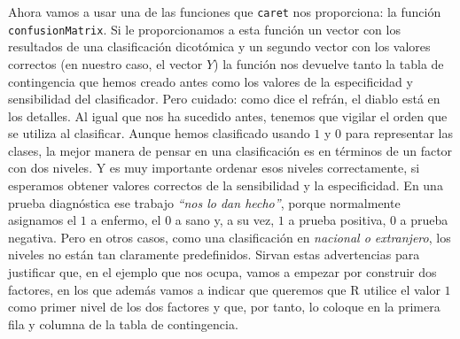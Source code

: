 \documentclass[10pt,a4paper]{article}\usepackage[]{graphicx}\usepackage[]{color}
\newcounter {cont01}
\begin{document}
Ahora vamos a usar una de las funciones que {\tt caret} nos proporciona: la función {\tt confusionMatrix}. Si le proporcionamos a esta función un vector con los resultados de una clasificación dicotómica y  un segundo vector con los valores correctos (en nuestro caso, el vector $Y$) la función nos devuelve tanto la tabla de contingencia que hemos creado antes como los valores de la especificidad y sensibilidad del clasificador. Pero cuidado: como dice el refrán, el diablo está en los detalles. Al igual que nos ha sucedido antes, tenemos que vigilar el orden que se utiliza al clasificar. Aunque hemos clasificado usando $1$ y $0$ para representar las clases, la mejor manera de pensar en una clasificación es en términos de un factor con dos niveles. Y es muy importante ordenar esos niveles correctamente, si esperamos obtener valores correctos de la sensibilidad y la especificidad. En una prueba diagnóstica ese trabajo {\em ``nos lo dan hecho''}, porque normalmente asignamos el $1$ a enfermo, el $0$ a sano y, a su vez, $1$ a prueba positiva, $0$ a prueba negativa. Pero en otros casos, como una clasificación en {\em nacional o extranjero}, los niveles no están tan claramente predefinidos. Sirvan estas advertencias para justificar que, en el ejemplo que nos ocupa, vamos a empezar por construir dos factores, en los que además vamos a indicar que queremos que R utilice el valor $1$ como primer nivel de los dos factores y que, por tanto, lo coloque en la primera fila y columna de la tabla de contingencia.
\end{document}
